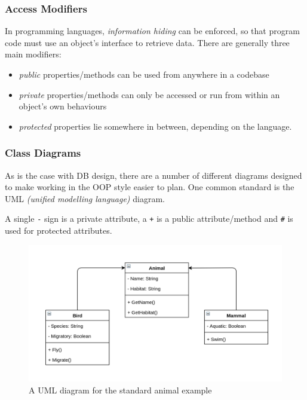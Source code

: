 \documentclass[9pt]{article}
\begin{document}
\subsubsection{Access Modifiers}
\label{sec:org0ada10a}

In programming languages, \emph{information hiding} can be enforced, so that program code must use an object's interface to retrieve data. There are generally three main modifiers:

\begin{itemize}
\item \emph{public} properties/methods can be used from anywhere in a codebase
\item \emph{private} properties/methods can only be accessed or run from within an object's own behaviours
\item \emph{protected} properties lie somewhere in between, depending on the language.
\end{itemize}

\subsubsection{Class Diagrams}
\label{sec:org659b578}

As is the case with DB design, there are a number of different diagrams designed to make working in the OOP style easier to plan. One common standard is the UML \emph{(unified modelling language)} diagram.

A single \texttt{-} sign is a private attribute, a \texttt{+} is a public attribute/method and \texttt{\#} is used for protected attributes.

\begin{figure}[htbp]
\centering
\includegraphics[width=.9\linewidth]{./images/uml.png}
\caption{A UML diagram for the standard animal example}
\end{figure}
\end{document}
